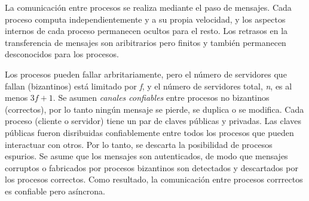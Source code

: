 La comunicación entre procesos se realiza mediante el paso de mensajes.
Cada proceso computa independientemente y a su propia velocidad, y los aspectos internos de cada proceso
permanecen ocultos para el resto. Los retrasos en la transferencia de mensajes son aribitrarios pero finitos
y también permanecen desconocidos para los procesos.

Los procesos pueden fallar arbritariamente, pero el número de servidores que fallan (bizantinos) está
limitado por \textit{f}, y el número de servidores total, \textit{n}, es al menos $3f + 1$.
Se asumen \textit{canales confiables} entre procesos no bizantinos (correctos), por lo tanto ningún
mensaje se pierde, se duplica o se modifica.
Cada proceso (cliente o servidor) tiene un par de claves públicas y privadas.
Las claves públicas fueron disribuidas confiablemente entre todos los procesos que pueden interactuar
con otros.
Por lo tanto, se descarta la posibilidad de procesos espurios.
Se asume que los mensajes son autenticados, de modo que mensajes corruptos o fabricados por
procesos bizantinos son detectados y descartados por los procesos correctos.
Como resultado, la comunicación entre procesos corrrectos es confiable pero asíncrona.

